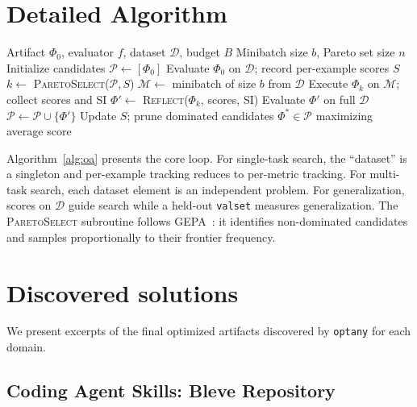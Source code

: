 \documentclass[sigconf,anonymous,review]{acmart}
\newcommand{\oa}{\texttt{optany}}
\newcommand{\asi}{SI}
\begin{document}
\section{Detailed Algorithm}\label{app:algorithm}

\begin{algorithm}[H]
\caption{\oa{}: Core optimization loop}
\label{alg:oa}
\begin{algorithmic}[1]
\small
\Require Artifact $\Phi_0$, evaluator $f$, dataset $\mathcal{D}$, budget $B$
\Require Minibatch size $b$, Pareto set size $n$
\State Initialize candidates $\mathcal{P} \gets [\Phi_0]$
\State Evaluate $\Phi_0$ on $\mathcal{D}$; record per-example scores $S$
  \State $k \gets$ \textsc{ParetoSelect}($\mathcal{P}, S$) 
  \State $\mathcal{M} \gets$ minibatch of size $b$ from $\mathcal{D}$
  \State Execute $\Phi_k$ on $\mathcal{M}$; collect scores and \asi{}
  \State $\Phi' \gets$ \textsc{Reflect}($\Phi_k$, scores, \asi{}) 
    \State Evaluate $\Phi'$ on full $\mathcal{D}$
    \State $\mathcal{P} \gets \mathcal{P} \cup \{\Phi'\}$
    \State Update $S$; prune dominated candidates
  \EndIf
\EndWhile
\State \Return $\Phi^* \in \mathcal{P}$ maximizing average score
\end{algorithmic}
\end{algorithm}

Algorithm~\ref{alg:oa} presents the core loop. For single-task search, the ``dataset'' is a singleton and per-example tracking reduces to per-metric tracking. For multi-task search, each dataset element is an independent problem. For generalization, scores on $\mathcal{D}$ guide search while a held-out \texttt{valset} measures generalization. The \textsc{ParetoSelect} subroutine follows GEPA~\cite{agrawal2026gepa}: it identifies non-dominated candidates and samples proportionally to their frontier frequency.

\section{Discovered solutions}
\label{app:discovered_solutions}

We present excerpts of the final optimized artifacts discovered by \oa{} for each domain. 

\subsection{Coding Agent Skills: Bleve Repository}
\label{app:sol-skills}
\end{document}
